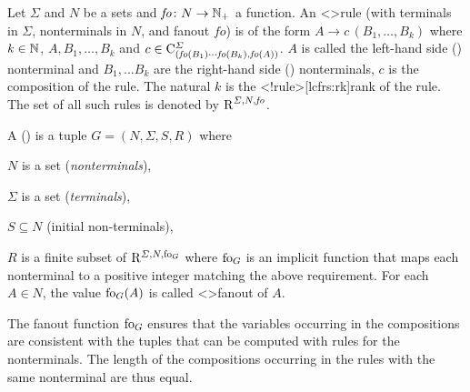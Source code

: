 \documentclass[../../document.tex]{subfiles}
\begin{document}
    \begin{definition}
        Let \(\varSigma\) and \(N\) be a sets and \(\mathit{fo}\colon N \to \mathbb{N}_+\) a function.
        An  <\lcfrs>{rule} (with terminals in \(\varSigma\), nonterminals in \(N\), and fanout \(\mathit{fo}\)) is of the form \(A \to c\,(B_1, \ldots, B_k)\) where \(k \in \mathbb{N}\), \(A, B_1, \ldots, B_k\) and \(c \in \mathrm{C}^\varSigma_{(\mathit{fo}(B_1) \cdots \mathit{fo}(B_k), \mathit{fo}(A))}\).
        \(A\) is called the left-hand side () nonterminal and \(B_1, \ldots B_k\) are the right-hand side () nonterminals, \(c\) is the composition of the rule.
        The natural \(k\) is the <\lcfrs!rule>[lcfrs:rk]{rank} of the rule.
        The set of all such  rules is denoted by \(\operatorname{R}^{\varSigma, N, \mathit{fo}}\).

        A  ()%
        is a tuple \(G=(N, \varSigma, S, R)\) where
        \begin{compactenum}
            \item \(N\) is a set (\emph{nonterminals}),
            \item \(\varSigma\) is a set (\emph{terminals}),
            \item \(S \subseteq N\) (initial non-terminals),
            \item \(R\) is a finite subset of \(\mathrm R^{\varSigma, N, \operatorname{fo}_G}\) where \(\operatorname{fo}_G\) is an implicit function that maps each nonterminal to a positive integer matching the above requirement. For each \(A \in N\), the value \(\operatorname{fo}_G(A)\) is called <\lcfrs>{fanout} of \(A\).
        \end{compactenum}
    \end{definition}

    The fanout function \(\operatorname{fo}_G\) ensures that the variables occurring in the compositions are consistent with the tuples that can be computed with rules for the  nonterminals.
    The length of the compositions occurring in the rules with the same  nonterminal are thus equal.
\end{document}
